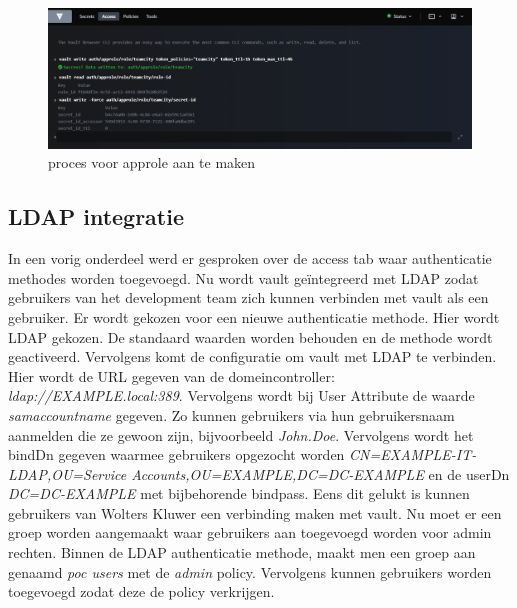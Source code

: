 \begin{figure}[htbp]
\centerline{\includegraphics[width=500]{bachproef/img/poc/approle aanmaken.png}}
\caption{proces voor approle aan te maken \autocite{vault}}
\label{ch:role}
\end{figure}

\subsection{LDAP integratie}
\label{ch:ldap}

In een vorig onderdeel werd er gesproken over de access tab waar authenticatie methodes worden toegevoegd. Nu wordt vault geïntegreerd met LDAP zodat gebruikers van het development team zich kunnen verbinden met vault als een gebruiker. Er wordt gekozen voor een nieuwe authenticatie methode. Hier wordt LDAP gekozen. De standaard waarden worden behouden en de methode wordt geactiveerd. Vervolgens komt de configuratie om vault met LDAP te verbinden. Hier wordt de URL gegeven van de domeincontroller: \textit{ldap://EXAMPLE.local:389}. Vervolgens wordt bij User Attribute de waarde \textit{samaccountname} gegeven. Zo kunnen gebruikers via hun gebruikersnaam aanmelden die ze gewoon zijn, bijvoorbeeld \textit{John.Doe}. Vervolgens wordt het bindDn gegeven waarmee gebruikers opgezocht worden \textit{CN=EXAMPLE-IT-LDAP,OU=Service Accounts,OU=EXAMPLE,DC=DC-EXAMPLE} en de userDn \textit{DC=DC-EXAMPLE} met bijbehorende bindpass. Eens dit gelukt is kunnen gebruikers van Wolters Kluwer een verbinding maken met vault. Nu moet er een groep worden aangemaakt waar gebruikers aan toegevoegd worden voor admin rechten. Binnen de LDAP authenticatie methode, maakt men een groep aan genaamd \textit{poc users} met de \textit{admin} policy. Vervolgens kunnen gebruikers worden toegevoegd zodat deze de policy verkrijgen.

